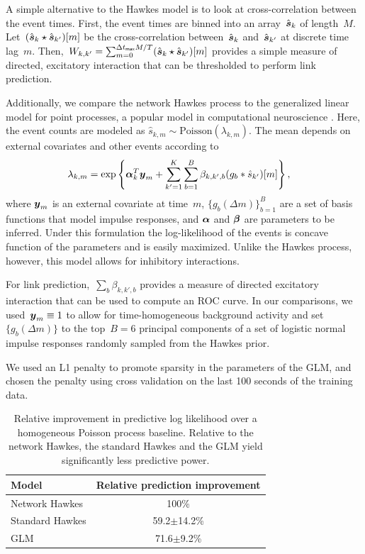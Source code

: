 A simple alternative to the Hawkes model is to look at
cross-correlation between the event times. First, the event times are
binned into an array~$\hat{\boldsymbol{s}}_k$ of length~$M$. Let~${(\hat{\boldsymbol{s}}_k
  \star \hat{\boldsymbol{s}}_{k'})[m]}$ be the cross-correlation
between~$\hat{\boldsymbol{s}}_k$ and~$\hat{\boldsymbol{s}}_{k'}$ at discrete time
lag~$m$. Then,~${W_{k,k'}=\sum_{m=0}^{\Delta
    t_{\mathsf{max}}M/T}(\hat{\boldsymbol{s}}_k \star \hat{\boldsymbol{s}}_{k'})[m]}$
provides a simple measure of directed, excitatory interaction that can
be thresholded to perform link prediction.

Additionally, we compare the network Hawkes process to the generalized
linear model for point processes, a popular model in computational
neuroscience \cite{Paninski-2004}. Here, the event counts are modeled
as ${\hat{s}_{k,m}\sim\text{Poisson}(\lambda_{k,m})}$. The mean
depends on external covariates and other events according to
\begin{align*}
  \lambda_{k,m} &= \exp\left\{ \boldsymbol{\alpha}_k^T\boldsymbol{y}_m + \sum_{k'=1}^K\sum_{b=1}^B \beta_{k,k',b} (g_{b}\ast \hat{s}_{k'})[m ]\right\},
\end{align*}
where $\boldsymbol{y}_m$ is an external covariate at time~$m$, $\{g_b(\Delta
m)\}_{b=1}^B$ are a set of basis functions that model impulse
responses, and $\boldsymbol{\alpha}$ and $\boldsymbol{\beta}$ are parameters to be
inferred. Under this formulation the log-likelihood of the events is
concave function of the parameters and is easily maximized. Unlike the
Hawkes process, however, this model allows for inhibitory
interactions.

For link prediction,~${\sum_b \beta_{k,k',b}}$ provides a measure of
directed excitatory interaction that can be used to compute an ROC
curve. In our comparisons, we used~${\boldsymbol{y}_m\equiv 1}$ to allow for
time-homogeneous background activity and set~${\{g_b(\Delta m)\}}$ to
the top~${B=6}$ principal components of a set of logistic normal
impulse responses randomly sampled from the Hawkes prior.

We used an L1 penalty to promote sparsity in the parameters of the
GLM, and chosen the penalty using cross validation on the last 100
seconds of the training data.

\begin{table}[h!]
  \begin{center}
    \begin{tabular}{|l|c|}
      \hline
      \textbf{Model} & \textbf{Relative prediction improvement} \\
      \hline
      Network Hawkes & 100\% \\
      Standard Hawkes & 59.2$\pm$14.2\% \\
      GLM & 71.6$\pm$9.2\%\\
      \hline
    \end{tabular}
  \end{center}
  \caption[Predictive log likelihood for synthetic data]{Relative
    improvement in predictive log likelihood over a homogeneous
    Poisson process baseline. Relative to the network Hawkes, the
    standard Hawkes and the GLM yield significantly less predictive
    power.}
  \label{tab:rel_pred_ll}
\end{table}

